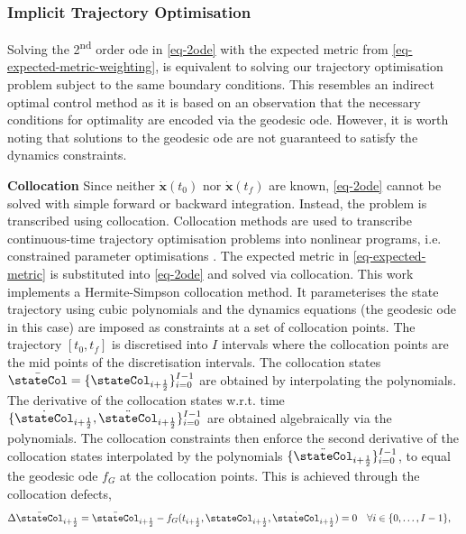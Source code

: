\documentclass{mimosis-class/mimosis}
\numberwithin{equation}{chapter}
\begin{document}
{\subsubsection{Implicit Trajectory Optimisation}
\label{sec:org97cbacd}
Solving the 2\textsuperscript{nd} order \acrshort{ode} in \cref{eq-2ode} with the expected metric from \cref{eq-expected-metric-weighting},
is equivalent to solving our trajectory optimisation problem subject to the same boundary conditions.
This resembles an indirect optimal control method as it is based on an observation that the
necessary conditions for optimality are encoded via the geodesic \acrshort{ode}.
However, it is worth noting that solutions to the geodesic \acrshort{ode} are not guaranteed to satisfy the
dynamics constraints.


\textbf{Collocation}
Since neither \(\dot{\mathbf{x}}(t_0)\) nor \(\dot{\mathbf{x}}(t_f)\) are known, \cref{eq-2ode} cannot
be solved with simple forward or backward integration.
Instead, the problem is transcribed using collocation.
Collocation methods are used to transcribe continuous-time trajectory optimisation problems into
nonlinear programs, i.e. constrained parameter optimisations \citep{kellyIntroduction2017,fahrooDirect2000}.
The expected metric in \cref{eq-expected-metric} is substituted into \cref{eq-2ode} and solved via collocation.
This work implements a Hermite-Simpson collocation method.
It parameterises the state trajectory using cubic polynomials and the dynamics equations (the geodesic \acrshort{ode} in this case)
are imposed as constraints at a set of collocation points.
The trajectory \([t_0, t_f]\) is discretised into \(I\) intervals where the collocation points
are the mid points of the discretisation intervals.
The collocation states
\(\bar{\stateCol} = \{\stateCol_{i+\frac{1}{2}}\}_{i=0}^{I-1}\)
are obtained by interpolating the polynomials.
The derivative of the collocation states w.r.t. time
\(\{\dot{\stateCol}_{i+\frac{1}{2}}, \ddot{\stateCol}_{i+\frac{1}{2}}\}_{i=0}^{I-1}\)
are obtained algebraically via the polynomials.
The collocation constraints then enforce
the second derivative of the collocation states interpolated by the polynomials \(\{\ddot{\stateCol}_{i+\frac{1}{2}} \}_{i=0}^{I-1}\),
to equal the geodesic \acrshort{ode} \(f_G\) at the collocation points.
This is achieved through the collocation defects,
\begin{align} \label{eq-defect}
\Delta\ddot{\stateCol}_{i+\frac{1}{2}} &= \ddot{\stateCol}_{i+\frac{1}{2}} - f_G(t_{i+\frac{1}{2}}, \stateCol_{i+\frac{1}{2}}, \dot{\stateCol}_{i+\frac{1}{2}}) = 0 \quad \forall i \in  \{ 0, \ldots, I-1\},

\end{align}}
\end{document}
